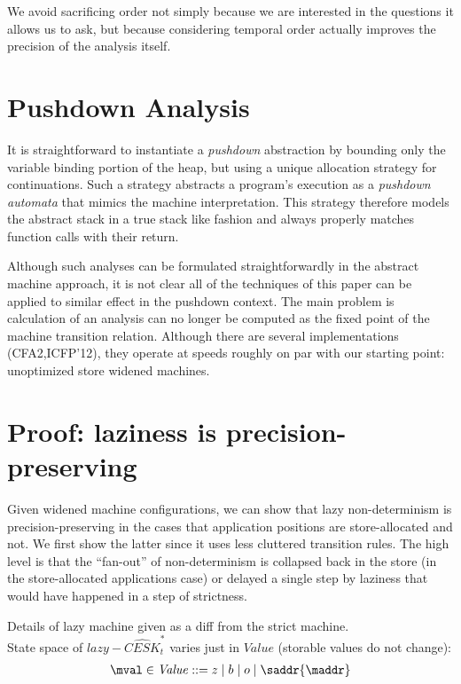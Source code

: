 We avoid sacrificing order not simply because we are interested in the
questions it allows us to ask, but because considering temporal order actually
improves the precision of the analysis itself.



\section{Pushdown Analysis}

It is straightforward to instantiate a \emph{pushdown} abstraction by
bounding only the variable binding portion of the heap, but using a
unique allocation strategy for continuations.  Such a strategy
abstracts a program's execution as a \emph{pushdown automata}
that mimics the machine interpretation.  This strategy therefore
models the abstract stack in a true stack like fashion and always
properly matches function calls with their return.

Although such analyses can be formulated straightforwardly in the
abstract machine approach, it is not clear all of the techniques of
this paper can be applied to similar effect in the pushdown context.
The main problem is calculation of an analysis can no longer be
computed as the fixed point of the machine transition relation.
Although there are several implementations (CFA2,ICFP'12), they
operate at speeds roughly on par with our starting point: unoptimized
store widened
machines. \cite{dvanhorn:Earl2012Introspective,dvanhorn:Vardoulakis2011CFA2}

\section{Proof: laziness is precision-preserving}
Given widened machine configurations, we can show that lazy
non-determinism is precision-preserving in the cases that application
positions are store-allocated and not. We first show the latter since
it uses less cluttered transition rules. The high level is that the
``fan-out'' of non-determinism is collapsed back in the store (in the
store-allocated applications case) or delayed a single step by
laziness that would have happened in a step of strictness.

Details of lazy machine given as a diff from the strict machine. \\
State space of $lazy-\widehat{CESK}^*_t$ varies just in
$\mathit{Value}$ (storable values do not change):
\begin{align*}
\mval \in \mathit{Value} &::= z \mid b \mid o \mid \saddr{\maddr} \\
\end{align*}

